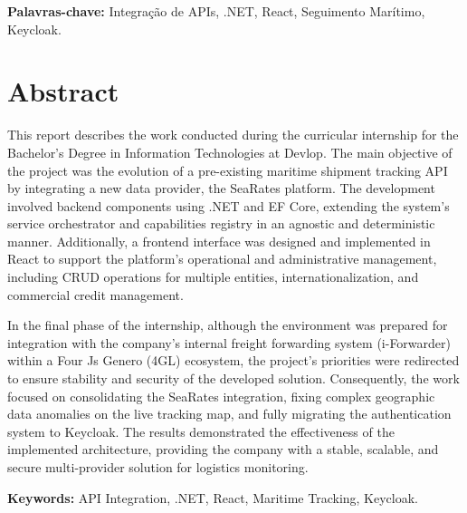 \documentclass[a4paper,12pt]{report}
\begin{document}
\vspace{1cm}
\noindent\textbf{Palavras-chave:} Integração de APIs, .NET, React, Seguimento Marítimo, Keycloak.

\newpage

\chapter*{Abstract}

This report describes the work conducted during the curricular internship for the Bachelor's Degree in Information Technologies at Devlop. The main objective of the project was the evolution of a pre-existing maritime shipment tracking API by integrating a new data provider, the SeaRates platform. The development involved backend components using .NET and EF Core, extending the system's service orchestrator and capabilities registry in an agnostic and deterministic manner. Additionally, a frontend interface was designed and implemented in React to support the platform's operational and administrative management, including CRUD operations for multiple entities, internationalization, and commercial credit management.

In the final phase of the internship, although the environment was prepared for integration with the company's internal freight forwarding system (i-Forwarder) within a Four Js Genero (4GL) ecosystem, the project's priorities were redirected to ensure stability and security of the developed solution. Consequently, the work focused on consolidating the SeaRates integration, fixing complex geographic data anomalies on the live tracking map, and fully migrating the authentication system to Keycloak. The results demonstrated the effectiveness of the implemented architecture, providing the company with a stable, scalable, and secure multi-provider solution for logistics monitoring.

\vspace{1cm}
\noindent\textbf{Keywords:} API Integration, .NET, React, Maritime Tracking, Keycloak.

\newpage

\tableofcontents
\newpage

\listoffigures
{}
\newpage

\listoftables
{}
\end{document}
